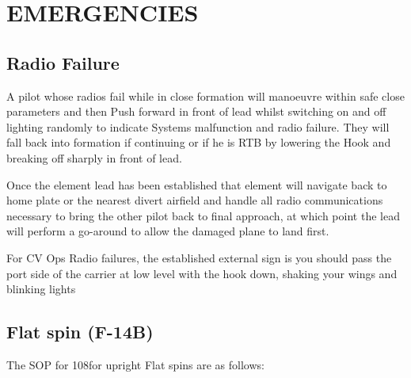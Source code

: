 \section{EMERGENCIES}

\subsection{Radio Failure}

A pilot whose radios fail while in close formation will manoeuvre within safe
close parameters and then Push forward in front of lead whilst switching on and
off lighting randomly to indicate Systems malfunction and radio failure. They
will fall back into formation if continuing or if he is RTB by lowering the
Hook and breaking off sharply in front of lead.

Once the element lead has been established that element will navigate back to
home plate or the nearest divert airfield and handle all radio communications
necessary to bring the other pilot back to final approach, at which point the
lead will perform a go-around to allow the damaged plane to land first.

For CV Ops Radio failures, the established external sign is you should pass the
port side of the carrier at low level with the hook down, shaking your wings
and blinking lights

\subsection{Flat spin (F-14B)}

The SOP for 108\th for upright Flat spins are as follows:

